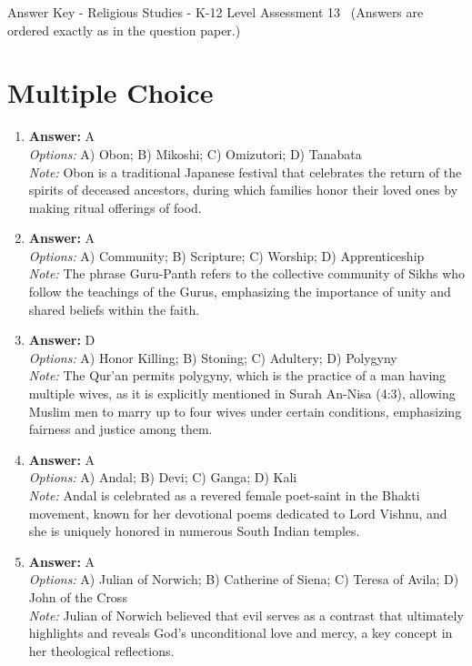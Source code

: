 \documentclass[12pt]{article}
\begin{document}
\begin{center}
Answer Key - Religious Studies - K-12 Level Assessment 13 \
\small (Answers are ordered exactly as in the question paper.)
\end{center}

\section*{Multiple Choice}
\begin{enumerate}[label=\arabic*.]
\item \textbf{Answer:} A
\\ \textit{Options:} A) Obon; B) Mikoshi; C) Omizutori; D) Tanabata
\\ \textit{Note:} Obon is a traditional Japanese festival that celebrates the return of the spirits of deceased ancestors, during which families honor their loved ones by making ritual offerings of food.
\item \textbf{Answer:} A
\\ \textit{Options:} A) Community; B) Scripture; C) Worship; D) Apprenticeship
\\ \textit{Note:} The phrase Guru-Panth refers to the collective community of Sikhs who follow the teachings of the Gurus, emphasizing the importance of unity and shared beliefs within the faith.
\item \textbf{Answer:} D
\\ \textit{Options:} A) Honor Killing; B) Stoning; C) Adultery; D) Polygyny
\\ \textit{Note:} The Qur'an permits polygyny, which is the practice of a man having multiple wives, as it is explicitly mentioned in Surah An-Nisa (4:3), allowing Muslim men to marry up to four wives under certain conditions, emphasizing fairness and justice among them.
\item \textbf{Answer:} A
\\ \textit{Options:} A) Andal; B) Devi; C) Ganga; D) Kali
\\ \textit{Note:} Andal is celebrated as a revered female poet-saint in the Bhakti movement, known for her devotional poems dedicated to Lord Vishnu, and she is uniquely honored in numerous South Indian temples.
\item \textbf{Answer:} A
\\ \textit{Options:} A) Julian of Norwich; B) Catherine of Siena; C) Teresa of Avila; D) John of the Cross
\\ \textit{Note:} Julian of Norwich believed that evil serves as a contrast that ultimately highlights and reveals God's unconditional love and mercy, a key concept in her theological reflections.
\end{enumerate}
\end{document}
